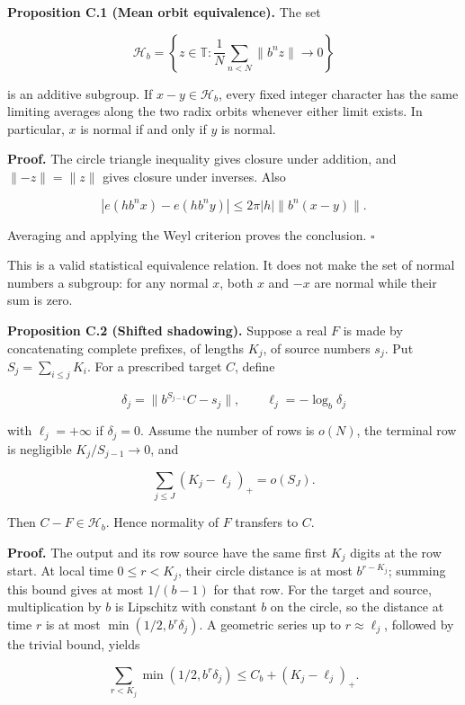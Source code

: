 \documentclass[11pt,a4paper]{article}
\begin{document}
\textbf{Proposition C.1 (Mean orbit equivalence).} The set

\[
\mathcal H_b=\left\lbrace z\in\mathbb T:
\frac1N\sum_{n< N}\lVert b^nz\rVert \longrightarrow0\right\rbrace
\]

is an additive subgroup. If \(x-y\in\mathcal H_b\), every fixed integer
character has the same limiting averages along the two radix orbits
whenever either limit exists. In particular, \(x\) is normal if and only
if \(y\) is normal.

\textbf{Proof.} The circle triangle inequality gives closure under
addition, and \(\lVert -z\rVert =\lVert z\rVert\) gives closure under
inverses. Also

\[
|e(hb^nx)-e(hb^ny)|\le2\pi|h|\lVert b^n(x-y)\rVert .
\]

Averaging and applying the Weyl criterion proves the conclusion.
\(\square\)

This is a valid statistical equivalence relation. It does not make the
set of normal numbers a subgroup: for any normal \(x\), both \(x\) and
\(-x\) are normal while their sum is zero.

\textbf{Proposition C.2 (Shifted shadowing).} Suppose a real \(F\) is
made by concatenating complete prefixes, of lengths \(K_j\), of source
numbers \(s_j\). Put \(S_j=\sum_{i\le j}K_i\). For a prescribed target
\(C\), define

\[
\delta_j=\lVert b^{S_{j-1}}C-s_j\rVert ,
\qquad \ell_j=-\log_b\delta_j
\]

with \(\ell_j=+\infty\) if \(\delta_j=0\). Assume the number of rows is
\(o(N)\), the terminal row is negligible \(K_j/S_{j-1}\to0\), and

\[
\sum_{j\le J}(K_j-\ell_j)_+=o(S_J).
\tag{C.1}
\]

Then \(C-F\in\mathcal H_b\). Hence normality of \(F\) transfers to
\(C\).

\textbf{Proof.} The output and its row source have the same first
\(K_j\) digits at the row start. At local time \(0\le r< K_j\), their
circle distance is at most \(b^{r-K_j}\); summing this bound gives at
most \(1/(b-1)\) for that row. For the target and source, multiplication
by \(b\) is Lipschitz with constant \(b\) on the circle, so the distance
at time \(r\) is at most \(\min(1/2,b^r\delta_j)\). A geometric series
up to \(r\approx\ell_j\), followed by the trivial bound, yields

\[
\sum_{r< K_j}\min(1/2,b^r\delta_j)
\le C_b+(K_j-\ell_j)_+.
\]
\end{document}
